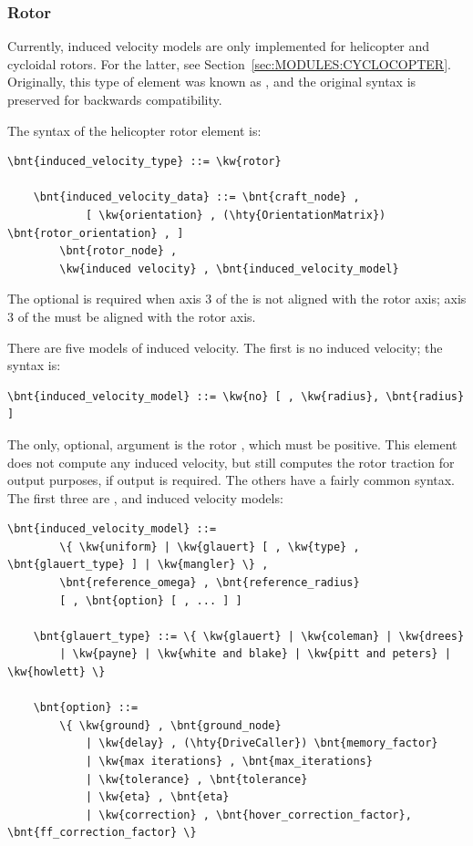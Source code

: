 \subsubsection{Rotor}
\label{sec:EL:AERO:INDVEL:ROTOR}
Currently, induced velocity models are only implemented
for helicopter and cycloidal rotors.
For the latter, see Section~\ref{sec:MODULES:CYCLOCOPTER}.
Originally, this type of element was known as ,
and the original syntax is preserved for backwards compatibility.

The syntax of the helicopter rotor  element is:
\begin{Verbatim}[commandchars=\\\{\}]
    \bnt{induced_velocity_type} ::= \kw{rotor}

    \bnt{induced_velocity_data} ::= \bnt{craft_node} ,
            [ \kw{orientation} , (\hty{OrientationMatrix}) \bnt{rotor_orientation} , ]
        \bnt{rotor_node} ,
        \kw{induced velocity} , \bnt{induced_velocity_model}
\end{Verbatim}
The optional  is required when axis 3
of the  is not aligned with the rotor axis; axis 3
of the  must be aligned with the rotor axis.

There are five models of induced velocity.
The first is no induced velocity; the syntax is:
\begin{Verbatim}[commandchars=\\\{\}]
    \bnt{induced_velocity_model} ::= \kw{no} [ , \kw{radius}, \bnt{radius} ]
\end{Verbatim}
The only, optional, argument is the rotor , which must be positive.
This element does not compute any induced
velocity, but still computes the rotor traction for output purposes,
if output is required.
The others have a fairly common syntax.  The first three are
,  and  induced velocity
models:
\begin{Verbatim}[commandchars=\\\{\}]
    \bnt{induced_velocity_model} ::=
        \{ \kw{uniform} | \kw{glauert} [ , \kw{type} , \bnt{glauert_type} ] | \kw{mangler} \} ,
        \bnt{reference_omega} , \bnt{reference_radius}
        [ , \bnt{option} [ , ... ] ]

    \bnt{glauert_type} ::= \{ \kw{glauert} | \kw{coleman} | \kw{drees}
        | \kw{payne} | \kw{white and blake} | \kw{pitt and peters} | \kw{howlett} \}

    \bnt{option} ::=
        \{ \kw{ground} , \bnt{ground_node}
            | \kw{delay} , (\hty{DriveCaller}) \bnt{memory_factor}
            | \kw{max iterations} , \bnt{max_iterations}
            | \kw{tolerance} , \bnt{tolerance}
            | \kw{eta} , \bnt{eta}
            | \kw{correction} , \bnt{hover_correction_factor}, \bnt{ff_correction_factor} \}
\end{Verbatim}

